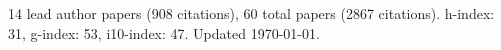 14 lead author papers (908 citations),
60 total papers (2867 citations).\newline
h-index: 31, g-index: 53, i10-index: 47. Updated \today.